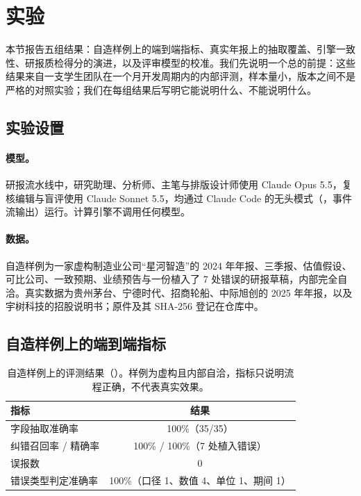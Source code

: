 \section{实验}
\label{sec:exp}

本节报告五组结果：自造样例上的端到端指标、真实年报上的抽取覆盖、引擎一致性、研报质检得分的演进，以及评审模型的校准。我们先说明一个总的前提：这些结果来自一支学生团队在一个月开发周期内的内部评测，样本量小，版本之间不是严格的对照实验；我们在每组结果后写明它能说明什么、不能说明什么。

\subsection{实验设置}
\paragraph{模型。}研报流水线中，研究助理、分析师、主笔与排版设计师使用 Claude Opus 5.5，复核编辑与盲评使用 Claude Sonnet 5.5，均通过 Claude Code 的无头模式（，事件流输出）运行。计算引擎不调用任何模型。

\paragraph{数据。}自造样例为一家虚构制造业公司“星河智造”的 2024 年年报、三季报、估值假设、可比公司、一致预期、业绩预告与一份植入了 7 处错误的研报草稿，内部完全自洽。真实数据为贵州茅台、宁德时代、招商轮船、中际旭创的 2025 年年报，以及宇树科技的招股说明书；原件及其 SHA-256 登记在仓库中。

\subsection{自造样例上的端到端指标}
\label{sec:exp-sample}

\begin{table}[h]
\centering
\caption{自造样例上的评测结果（）。样例为虚构且内部自洽，指标只说明流程正确，不代表真实效果。}
\label{tab:sample}
\small
\begin{tabular}{@{}lc@{}}
\toprule
指标 & 结果 \\
\midrule
字段抽取准确率 & 100\%（35/35） \\
纠错召回率 / 精确率 & 100\% / 100\%（7 处植入错误） \\
误报数 & 0 \\
错误类型判定准确率 & 100\%（口径 1、数值 4、单位 1、期间 1） \\
\bottomrule
\end{tabular}
\end{table}

